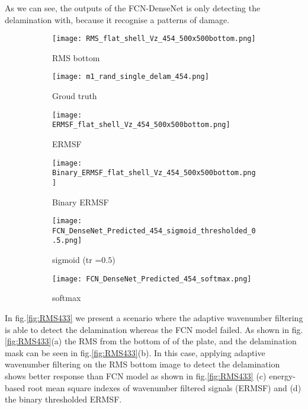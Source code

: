 	As we can see, the outputs of the FCN-DenseNet is only detecting the delamination with, because it recognise a patterns of damage.
	
	\begin{figure} [h!]
		\centering
		\begin{subfigure}[b]{0.47\textwidth}
			\centering
			\texttt{[image: RMS\_flat\_shell\_Vz\_454\_500x500bottom.png]}
			\caption{RMS bottom}
			\label{fig:dispersion30deg_direct}
		\end{subfigure}
		\hfill
		\begin{subfigure}[b]{0.47\textwidth}
			\centering
			\texttt{[image: m1\_rand\_single\_delam\_454.png]}
			\caption{Groud truth}
			\label{fig:m1_rand_single_delam_454}
		\end{subfigure}
		\hfill
		\begin{subfigure}[b]{0.47\textwidth}
			\centering
			\texttt{[image: ERMSF\_flat\_shell\_Vz\_454\_500x500bottom.png]}
			\caption{ERMSF}
			\label{fig:ERMSF_flat_shell_Vz_454}
		\end{subfigure}
		\hfill
		\begin{subfigure}[b]{0.47\textwidth}
			\centering
			\texttt{[image: Binary\_ERMSF\_flat\_shell\_Vz\_454\_500x500bottom.png]}
			\caption{Binary ERMSF}
			\label{fig:Binary_ERMSF}
		\end{subfigure}
		\hfill
		\begin{subfigure}[b]{0.47\textwidth}
			\centering
			\texttt{[image: FCN\_DenseNet\_Predicted\_454\_sigmoid\_thresholded\_0.5.png]}
			\caption{sigmoid (tr =\(0.5\))}
			\label{fig:predict_454_sigmoid_tr_0.5}
		\end{subfigure}
		\hfill	
		\begin{subfigure}[b]{0.47\textwidth}
			\centering
			\texttt{[image: FCN\_DenseNet\_Predicted\_454\_softmax.png]}
			\caption{softmax}
			\label{fig:predict_454_softmax}
		\end{subfigure}
	
	
		\caption{}
		\label{fig:RMS454}
	\end{figure} 

	In fig.\ref{fig:RMS433} we present a scenario where the adaptive wavenumber filtering is able to detect the delamination whereas the FCN model failed.
	As shown in fig.\ref{fig:RMS433}(a) the RMS from the bottom of of the plate, and the delamination mask can be seen in fig.\ref{fig:RMS433}(b). 
	In this case, applying adaptive wavenumber filtering on the RMS bottom image to detect the delamination shows better response than FCN model 
	as shown in fig.\ref{fig:RMS433} (c) energy-based root mean square indexes of wavenumber filtered signals (ERMSF) and (d) the binary thresholded ERMSF. 
	
